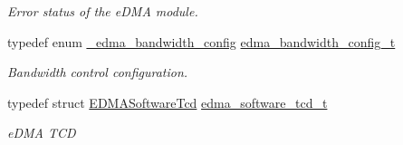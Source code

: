 \begin{DoxyCompactItemize}
\begin{DoxyCompactList}\small\item\em Error status of the e\+D\+MA module. \end{DoxyCompactList}\item 
typedef enum \hyperlink{group__edma__hal_ga82ff0dd938b1e22cb64cfa9e42929c31}{\+\_\+edma\+\_\+bandwidth\+\_\+config} \hyperlink{group__edma__hal_gace5d82450e3fb3e27715ebb7d26ec080}{edma\+\_\+bandwidth\+\_\+config\+\_\+t}\hypertarget{group__edma__hal_gace5d82450e3fb3e27715ebb7d26ec080}{}\label{group__edma__hal_gace5d82450e3fb3e27715ebb7d26ec080}

\begin{DoxyCompactList}\small\item\em Bandwidth control configuration. \end{DoxyCompactList}\item 
typedef struct \hyperlink{structEDMASoftwareTcd}{E\+D\+M\+A\+Software\+Tcd} \hyperlink{group__edma__hal_ga7cc4084521c106d714c925fddff92b40}{edma\+\_\+software\+\_\+tcd\+\_\+t}\hypertarget{group__edma__hal_ga7cc4084521c106d714c925fddff92b40}{}\label{group__edma__hal_ga7cc4084521c106d714c925fddff92b40}

\begin{DoxyCompactList}\small\item\em e\+D\+MA T\+CD \end{DoxyCompactList}\end{DoxyCompactItemize}
